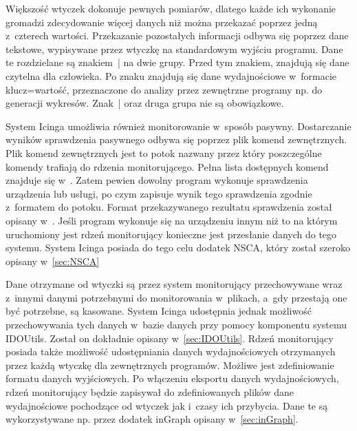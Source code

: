 Większość wtyczek dokonuje pewnych pomiarów, dlatego każde ich
wykonanie gromadzi zdecydowanie więcej danych niż można przekazać
poprzez jedną z~czterech wartości. Przekazanie pozostałych informacji
odbywa się poprzez dane tekstowe, wypisywane przez wtyczkę na
standardowym wyjściu programu. Dane te rozdzielane są znakiem~| na dwie
grupy. Przed tym znakiem, znajdują się dane czytelna dla człowieka. Po
znaku znajdują się dane wydajnościowe w~formacie klucz=wartość,
przeznaczone do analizy przez zewnętrzne programy np. do generacji
wykresów. Znak~| oraz druga grupa nie są obowiązkowe.

System Icinga umożliwia również monitorowanie w~sposób
pasywny. Dostarczanie wyników sprawdzenia pasywnego odbywa się poprzez
plik komend zewnętrznych. Plik komend zewnętrznych jest to potok
nazwany przez który poszczególne komendy trafiają do rdzenia
monitorującego. Pełna lista dostępnych komend znajduje się
w~\cite[412-436]{www:IcingaDoc}. Zatem pewien dowolny program wykonuje
sprawdzenia urządzenia lub usługi, po czym zapisuje wynik tego
sprawdzenia zgodnie z~formatem do potoku. Format przekazywanego
rezultatu sprawdzenia został opisany
w~\cite[296-299]{www:IcingaDoc}. Jeśli program wykonuje się na
urządzeniu innym niż to na którym uruchomiony jest rdzeń monitorujący
konieczne jest przesłanie danych do tego systemu. System Icinga
posiada do tego celu dodatek NSCA, który został szeroko opisany
w~\ref{sec:NSCA}

Dane otrzymane od wtyczki są przez system monitorujący przechowywane
wraz z~innymi danymi potrzebnymi do monitorowania w~plikach, a~gdy
przestają one być potrzebne, są kasowane. System Icinga udostępnia
jednak możliwość przechowywania tych danych w~bazie danych przy pomocy
komponentu systemu IDOUtils. Został on dokładnie opisany
w~\ref{sec:IDOUtils}. Rdzeń monitorujący posiada także możliwość
udostępniania danych wydajnościowych otrzymanych przez każdą wtyczkę
dla zewnętrznych programów. Możliwe jest zdefiniowanie formatu danych
wyjściowych. Po włączeniu eksportu danych wydajnościowych, rdzeń
monitorujący będzie zapisywał do zdefiniowanych plików dane
wydajnościowe pochodzące od wtyczek jak i~czasy ich przybycia. Dane te
są wykorzystywane np. przez dodatek inGraph opisany
w~\ref{sec:inGraph}.

